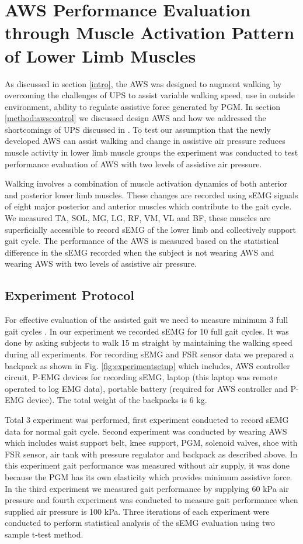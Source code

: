 \documentclass[letterpaper, 10 pt, conference]{ieeeconf}  %
\begin{document}
\section{AWS Performance Evaluation through Muscle Activation Pattern of Lower Limb Muscles} \label{Evaluation}

As discussed in section \ref{intro}, the AWS was designed to augment walking by overcoming the challenges of UPS to assist variable walking speed, use in outside environment, ability to regulate assistive force generated by PGM. In section \ref{method:awscontrol} we discussed design AWS and how we addressed the shortcomings of UPS discussed in \cite{14}. To test our assumption that the newly developed AWS can assist walking and change in assistive air pressure reduces muscle activity in lower limb muscle groups the experiment was conducted to test performance evaluation of AWS with two levels of assistive air pressure. 

Walking involves a combination of muscle activation dynamics of both anterior and posterior lower limb muscles. These changes are recorded using sEMG signals of eight major posterior and anterior muscles which contribute to the gait cycle. We measured TA, SOL, MG, LG, RF, VM, VL and BF, these muscles are superficially accessible to record sEMG of the lower limb and collectively support gait cycle. The performance of the AWS is measured based on the statistical difference in the sEMG recorded when the subject is not wearing AWS and wearing AWS with two levels of assistive air pressure.

\subsection{Experiment Protocol}
For effective evaluation of the assisted gait we need to measure minimum 3 full gait cycles \cite{17}. In our experiment we recorded sEMG for 10 full gait cycles. It was done by asking subjects to walk 15 m straight by maintaining the walking speed during all experiments. For recording sEMG and FSR sensor data we prepared a backpack as shown in Fig. \ref{fig:experimentsetup} which includes, AWS controller circuit, P-EMG devices for recording sEMG, laptop (this laptop was remote operated to log EMG data), portable battery (required for AWS controller and P-EMG device). The total weight of the backpacks is 6 kg.

Total 3 experiment was performed, first experiment conducted to record sEMG data for normal gait cycle. Second experiment was conducted by wearing AWS which includes waist support belt, knee support, PGM, solenoid valves, shoe with FSR sensor, air tank with pressure regulator and backpack as described above. In this experiment gait performance was measured without air supply, it was done because the PGM has its own elasticity which provides minimum assistive force. In the third experiment we measured gait performance by supplying 60 kPa air pressure and fourth experiment was conducted to measure gait performance when supplied air pressure is 100 kPa. Three iterations of each experiment were conducted to perform statistical analysis of the sEMG evaluation using two sample t-test method.  
\end{document}
